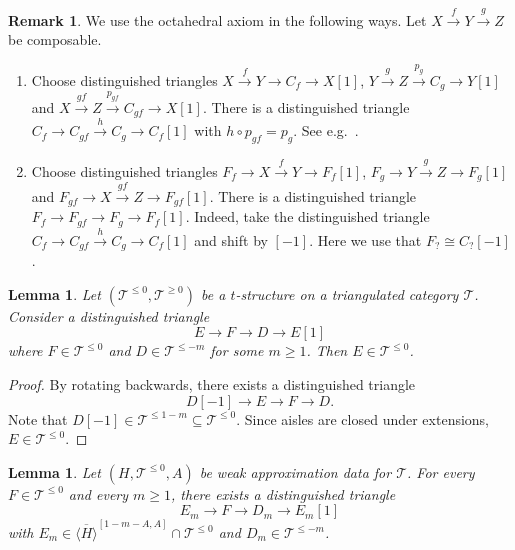 \documentclass[11pt]{amsart}
\theoremstyle{plain}
\newtheorem{lemma}[theorem]{Lemma}
\theoremstyle{definition}
\newtheorem{remark}[theorem]{Remark}
\numberwithin{equation}{section}
\numberwithin{theorem}{section}
\begin{document}
\begin{remark}
    \label{rmk:octahedral}
    We use the octahedral axiom in the following ways.
    Let $X\xrightarrow{f} Y\xrightarrow{g} Z$ be composable.
    \begin{enumerate}
        \item \label{rmk:octahedraloc} Choose distinguished triangles $X\xrightarrow{f} Y\to C_f\to X[1]$, $Y\xrightarrow{g} Z\xrightarrow{p_g} C_g\to Y[1]$ and $X\xrightarrow{gf} Z\xrightarrow{p_{gf}} C_{gf}\to X[1]$. There is a distinguished triangle $C_f\to C_{gf}\xrightarrow{h} C_g\to C_f[1]$ with $h\circ p_{gf} = p_g$. See e.g.\ \cite[Proposition 1.4.6]{Neeman:2001}.
        \item \label{rmk:octahedralof} Choose distinguished triangles $F_f\to X\xrightarrow{f} Y\to F_f[1]$, $F_g\to Y\xrightarrow{g} Z\to F_g[1]$ and $F_{gf}\to X\xrightarrow{gf} Z\to F_{gf}[1]$. There is a distinguished triangle $F_f\to F_{gf}\to F_g\to F_f[1]$. Indeed, take the distinguished triangle $C_f\to C_{gf}\xrightarrow{h} C_g\to C_f[1]$ and shift by $[-1]$. Here we use that $F_? \cong C_?[-1]$.
    \end{enumerate}
\end{remark}

\begin{lemma}
    \label{lem:aisle}
    Let $(\mathcal{T}^{\leq 0},\mathcal{T}^{\geq 0})$ be a $t$-structure on a triangulated category $\mathcal{T}$.
    Consider a distinguished triangle  
    \begin{displaymath}
        E\to F\to D\to E[1]
    \end{displaymath}
    where $F\in \mathcal{T}^{\leq 0}$ and $D\in \mathcal{T}^{\leq -m}$ for some $m\geq 1$.
    Then $E\in \mathcal{T}^{\leq 0}$.
\end{lemma}

\begin{proof}
    By rotating backwards, there exists a distinguished triangle  
    \begin{displaymath}
       D[-1] \to E\to F\to D.
    \end{displaymath}
    Note that $D[-1]\in \mathcal{T}^{\leq 1-m} \subseteq \mathcal{T}^{\leq 0}$.
    Since aisles are closed under extensions, $E\in \mathcal{T}^{\leq 0}$.
\end{proof}

\begin{lemma}
    \label{lem:iterate}
    Let $(H,\mathcal{T}^{\leq 0},A)$ be weak approximation data for $\mathcal{T}$.
    For every $F\in \mathcal{T}^{\leq 0}$ and every $m\geq 1$, there exists a distinguished triangle 
    \begin{displaymath}
        E_m\to F\to D_m\to E_m[1]
    \end{displaymath}
    with $E_m\in \overline{\langle H\rangle}^{[1-m-A,A]} \cap \mathcal{T}^{\leq 0}$ and $D_m\in \mathcal{T}^{\leq -m}$. 
\end{lemma}
\end{document}
